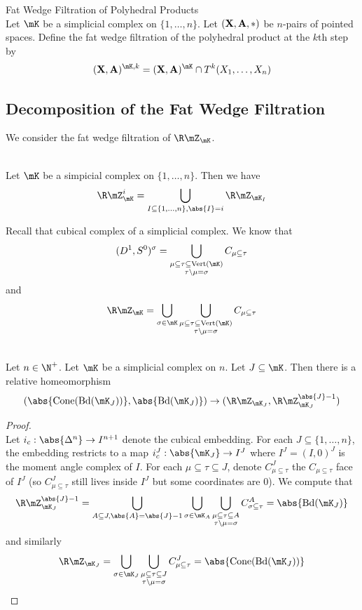 \documentclass[a4paper]{article}
\begin{document}
\begin{defn}{Fat Wedge Filtration of Polyhedral Products}{}\\
Let $\mK$ be a simplicial complex on $\{1,\dots,n\}$. Let $(\bold{X},\bold{A},\ast)$ be $n$-pairs of pointed spaces. Define the fat wedge filtration of the polyhedral product at the $k$th step by $$(\bold{X},\bold{A})^{\mK,k}=(\bold{X},\bold{A})^\mK\cap T^k(X_1,\dots,X_n)$$
\end{defn}

\subsection{Decomposition of the Fat Wedge Filtration}
We consider the fat wedge filtration of $\R\mZ_\mK$. 

\begin{prp}{}{}\\
Let $\mK$ be a simpicial complex on $\{1,\dots,n\}$. Then we have $$\R\mZ_\mK^i=\bigcup_{I\subseteq\{1,\dots,n\},\abs{I}=i}\R\mZ_{\mK_I}$$
\end{prp}

Recall that cubical complex of a simplicial complex. We know that $$(D^1,S^0)^\sigma=\bigcup_{\substack{\mu\subseteq\tau\subseteq\text{Vert}(\mK)\\\tau\setminus\mu=\sigma}}C_{\mu\subseteq\tau}$$ and $$\R\mZ_{\mK}=\bigcup_{\sigma\in\mK}\bigcup_{\substack{\mu\subseteq\tau\subseteq\text{Vert}(\mK)\\\tau\setminus\mu=\sigma}}C_{\mu\subseteq\tau}$$

\begin{prp}{}{}\\
Let $n\in\N^+$. Let $\mK$ be a simplicial complex on $n$. Let $J\subseteq\mK$. Then there is a relative homeomorphism $$(\abs{\text{Cone}(\text{Bd}(\mK_J))},\abs{\text{Bd}(\mK_J)})\to(\R\mZ_{\mK_J},\R\mZ_{\mK_J}^{\abs{J}-1})$$
\begin{proof}\\
Let $i_c:\abs{\Delta^n}\to I^{n+1}$ denote the cubical embedding. For each $J\subseteq\{1,\dots,n\}$, the embedding restricts to a map $i_c^J:\abs{\mK_J}\to I^J$ where $I^J=(I,0)^J$ is the moment angle complex of $I$. For each $\mu\subseteq\tau\subseteq J$, denote $C_{\mu\subseteq\tau}^J$ the $C_{\mu\subseteq\tau}$ face of $I^J$ (so $C_{\mu\subseteq\tau}^J$ still lives inside $I^J$ but some coordinates are $0$). We compute that $$\R\mZ_{\mK_J}^{\abs{J}-1}=\bigcup_{\substack{A\subseteq J,\abs{A}=\abs{J}-1}}\bigcup_{\sigma\in\mK_A}\bigcup_{\substack{\mu\subseteq\tau\subseteq A\\\tau\setminus\mu=\sigma}}C_{\sigma\subseteq\tau}^A=\abs{\text{Bd}(\mK_J)}$$ and similarly $$\R\mZ_{\mK_J}=\bigcup_{\sigma\in\mK_J}\bigcup_{\substack{\mu\subseteq\tau\subseteq J\\\tau\setminus\mu=\sigma}}C_{\mu\subseteq\tau}^J=\abs{\text{Cone}(\text{Bd}(\mK_J))}$$
\end{proof}
\end{prp}
\end{document}
